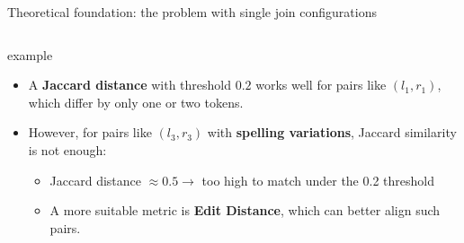 \documentclass[8pt]{beamer} %
\begin{document}
\begin{frame}{Theoretical foundation: the problem with single join configurations}
\begin{columns}
\begin{column}{0.45\textwidth}
\begin{beamercolorbox}[rounded=true, shadow=true, leftskip=1em, rightskip=1em]{example}
				
				\vspace{0.5em}
				\small
				\begin{itemize}
					\item A \textbf{Jaccard distance} with threshold $0.2$ works well for pairs like $(l_1, r_1)$, which differ by only one or two tokens.
					\item However, for pairs like $(l_3, r_3)$ with \textbf{spelling variations}, Jaccard similarity is not enough:
					\begin{itemize}
						\item Jaccard distance $\approx 0.5 \rightarrow$ too high to match under the 0.2 threshold
						\item A more suitable metric is \textbf{Edit Distance}, which can better align such pairs.
					\end{itemize}
				\end{itemize}
			
		\end{beamercolorbox}
		
		\end{column}

	\end{columns}
	
\end{frame}
\end{document}
